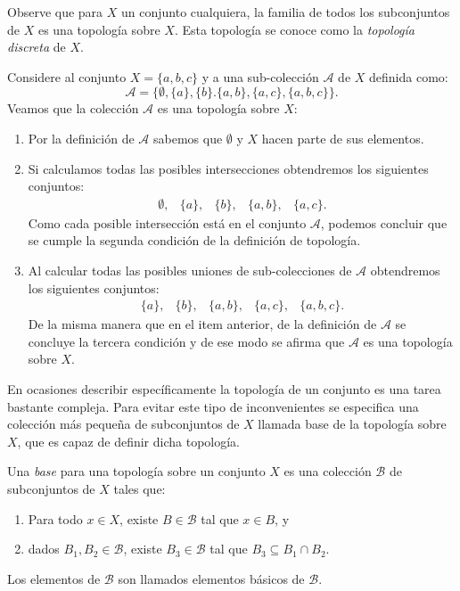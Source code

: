 \begin{example}\label{ex:topologíaDiscreta} 
Observe que para $X$ un conjunto cualquiera, la familia de todos los subconjuntos de $X$ es una topología sobre $X$. Esta topología se conoce como la \textit{topología discreta} de $X$.
\end{example}

\begin{example}\label{ex:exBase}
Considere al conjunto $X=\{a,b,c\}$ y a una sub-colección $\mathcal{A}$ de $X$ definida como: 
$$\mathcal{A}=\{\emptyset,\{a\},\{b\}.\{a,b\},\{a,c\},\{a,b,c\}\}.$$
Veamos que la colección $\mathcal{A}$ es una topología sobre $X$:
\begin{enumerate}
    \item Por la definición de $\mathcal{A}$ sabemos que $\emptyset$ y $X$ hacen parte de sus elementos.
    \item Si calculamos todas las posibles intersecciones obtendremos los siguientes conjuntos:
    $$\begin{array}{cccccc}
        \emptyset, & \{a\}, & \{b\}, & \{a,b\}, & \{a,c\}.
    \end{array}$$
    Como cada posible intersección está en el conjunto $\mathcal{A}$, podemos concluir que se cumple la segunda condición de la definición de topología.
    \item Al calcular todas las posibles uniones de sub-colecciones de $\mathcal{A}$ obtendremos los siguientes conjuntos:
    $$\begin{array}{cccccc}
        \{a\}, & \{b\}, & \{a,b\}, & \{a,c\}, & \{a,b,c\}.
    \end{array}$$
    De la misma manera que en el item anterior, de la definición de $\mathcal{A}$ se concluye la tercera condición y de ese modo se afirma que $\mathcal{A}$ es una topología sobre $X$.
\end{enumerate}
\end{example}

En ocasiones describir específicamente la topología de un conjunto es una tarea bastante compleja. Para evitar este tipo de inconvenientes se especifica una colección más pequeña de subconjuntos de $X$ llamada base de la topología sobre $X$, que es capaz de definir dicha topología. 

\begin{definition}\label{def:base}
Una \textit{base} para una topología sobre un conjunto $X$ es una colección $\mathcal{B}$ de subconjuntos de $X$ tales que:
\begin{enumerate}
    \item Para todo $x\in X$, existe $B\in\mathcal{B}$ tal que $x\in B$, y
    \item dados $B_1,B_2\in\mathcal{B}$, existe $B_3\in\mathcal{B}$ tal que $B_3\subseteq B_1\cap B_2$.
\end{enumerate}
Los elementos de $\mathcal{B}$ son llamados elementos básicos de $\mathcal{B}$.
\end{definition}

